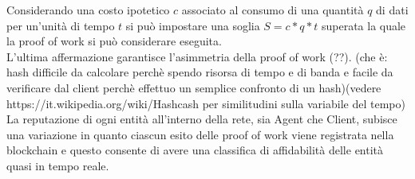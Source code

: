 \documentclass[]{article}
\begin{document}
	
	Considerando una costo ipotetico $c$ associato al consumo di una quantità $q$ di dati per un'unità di tempo $t$ si può impostare una soglia $S = c*q*t$ superata la quale la proof of work si può considerare eseguita.\\
	L'ultima affermazione garantisce l'asimmetria della proof of work (??). (che è: hash difficile da calcolare perchè spendo risorsa di tempo e di banda e facile da verificare dal client perchè effettuo un semplice confronto di un hash)(vedere https://it.wikipedia.org/wiki/Hashcash per similitudini sulla variabile del tempo)\\
	
	
	La reputazione di ogni entità all'interno della rete, sia Agent che Client, subisce una variazione in quanto ciascun esito delle proof of work viene registrata nella blockchain e questo consente di avere una classifica di affidabilità delle entità quasi in tempo reale.\\
	
	
	
\end{document}
